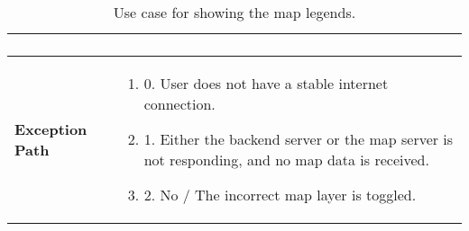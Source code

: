 \begin{table}[h]
\begin{tabularx}{\textwidth}{|l|X|}
\begin{enumerate}[label=,left=0pt]
        \end{enumerate} \\
        \hline
        \textbf{Exception Path} & 
        \begin{enumerate}[label=,left=0pt]
            \item 0. User does not have a stable internet connection.
            \item 1. Either the backend server or the map server is not responding, and no map data is received.
            \item 2. No / The incorrect map layer is toggled.
        \end{enumerate} \\
        \hline
    \end{tabularx}
    \caption[Use Case Specification: Show Map Legend]{Use case for showing the map legends.}
    \label{tab:use_case_show_legend_appendix}
\end{table}

